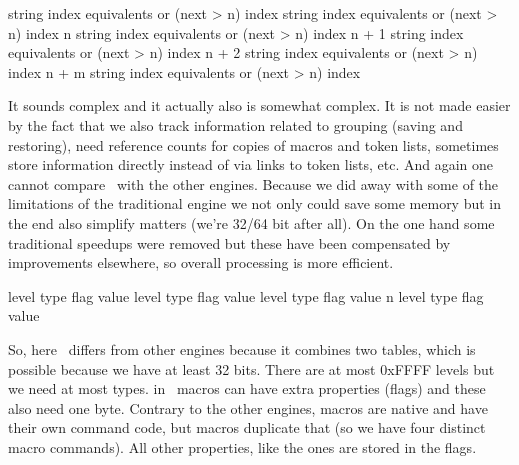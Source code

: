 \startlinecorrection[blank]
    \setupTABLE[each][align=middle]
    \setupTABLE[c][1][width=16mm]
    \setupTABLE[c][2][width=64mm]
    \setupTABLE[c][3][width=64mm]
    \bTABLE
        \bTR {}     \eTD \bTD string index \eTD \bTD equivalents or (next > n) index \eTD \eTR
        \bTR {}     \eTD \bTD string index \eTD \bTD equivalents or (next > n) index \eTD \eTR
        \bTR \bTD n     \eTD \bTD string index \eTD \bTD equivalents or (next > n) index \eTD \eTR
        \bTR \bTD n + 1 \eTD \bTD string index \eTD \bTD equivalents or (next > n) index \eTD \eTR
        \bTR \bTD n + 2 \eTD \bTD string index \eTD \bTD equivalents or (next > n) index \eTD \eTR
        \bTR \bTD n + m \eTD \bTD string index \eTD \bTD equivalents or (next > n) index \eTD \eTR
    \eTABLE
\stoplinecorrection

It sounds complex and it actually also is somewhat complex. It is not made easier
by the fact that we also track information related to grouping (saving and
restoring), need reference counts for copies of macros and token lists, sometimes
store information directly instead of via links to token lists, etc. And again
one cannot compare \LUAMETATEX\ with the other engines. Because we did away with
some of the limitations of the traditional engine we not only could save some
memory but in the end also simplify matters (we're 32/64 bit after all). On the one
hand some traditional speedups were removed but these have been compensated by
improvements elsewhere, so overall processing is more efficient.

\startlinecorrection[blank]
    \setupTABLE[each][align=middle]
    \setupTABLE[c][1][width=8mm]
    \setupTABLE[c][2][width=32mm]
    \setupTABLE[c][3][width=16mm]
    \setupTABLE[c][4][width=16mm]
    \setupTABLE[c][5][width=64mm]
    \bTABLE
        \bTR {} \eTD \bTD level \eTD \bTD type \eTD \bTD flag \eTD \bTD value \eTD \eTR
        \bTR {} \eTD \bTD level \eTD \bTD type \eTD \bTD flag \eTD \bTD value \eTD \eTR
        \bTR {} \eTD \bTD level \eTD \bTD type \eTD \bTD flag \eTD \bTD value \eTD \eTR
        \bTR \bTD n \eTD \bTD level \eTD \bTD type \eTD \bTD flag \eTD \bTD value \eTD \eTR
    \eTABLE
\stoplinecorrection

So, here \LUAMETATEX\ differs from other engines because it combines two tables,
which is possible because we have at least 32 bits. There are at most \type
{0xFFFF} levels but we need at most  types. in \LUAMETATEX\ macros
can have extra properties (flags) and these also need one byte. Contrary to the
other engines, \type {\protected} macros are native and have their own command
code, but \type {\tolerant} macros duplicate that (so we have four distinct macro
commands). All other properties, like the \type {\permanent} ones are stored in
the flags.

